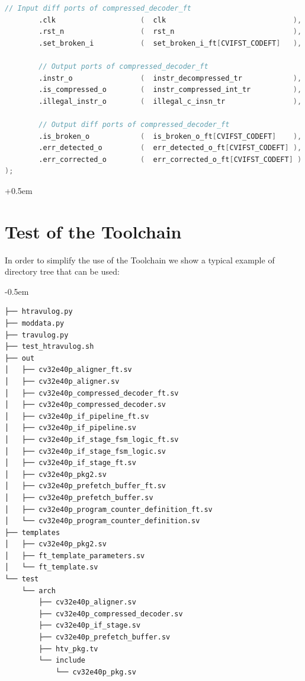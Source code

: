 {{{\begin{lstlisting}[basicstyle=\ttfamily\scriptsize, language=Verilog, caption=SV result code after the conversion from HTV code of Compressed Decoder module, label=lst:CreateAddModuleSV2]
        // Input diff ports of compressed_decoder_ft
        .clk                    (  clk                              ),
        .rst_n                  (  rst_n                            ),
        .set_broken_i           (  set_broken_i_ft[CVIFST_CODEFT]   ),

        // Output ports of compressed_decoder_ft
        .instr_o                (  instr_decompressed_tr            ),
        .is_compressed_o        (  instr_compressed_int_tr          ),
        .illegal_instr_o        (  illegal_c_insn_tr                ),

        // Output diff ports of compressed_decoder_ft
        .is_broken_o            (  is_broken_o_ft[CVIFST_CODEFT]    ),
        .err_detected_o         (  err_detected_o_ft[CVIFST_CODEFT] ),
        .err_corrected_o        (  err_corrected_o_ft[CVIFST_CODEFT] )
);
       			\end{lstlisting}
    		
    		\openup +0.5em
        }%
	}%
	
	\section{Test of the Toolchain}{
	    In order to simplify the use of the Toolchain we show a typical example of directory tree that can be used:
	    
	    
	    \begin{footnotesize}
    	
    	\openup -0.5em
	    
	    \begin{verbatim}
├── htravulog.py
├── moddata.py
├── travulog.py
├── test_htravulog.sh
├── out
│   ├── cv32e40p_aligner_ft.sv
│   ├── cv32e40p_aligner.sv
│   ├── cv32e40p_compressed_decoder_ft.sv
│   ├── cv32e40p_compressed_decoder.sv
│   ├── cv32e40p_if_pipeline_ft.sv
│   ├── cv32e40p_if_pipeline.sv
│   ├── cv32e40p_if_stage_fsm_logic_ft.sv
│   ├── cv32e40p_if_stage_fsm_logic.sv
│   ├── cv32e40p_if_stage_ft.sv
│   ├── cv32e40p_pkg2.sv
│   ├── cv32e40p_prefetch_buffer_ft.sv
│   ├── cv32e40p_prefetch_buffer.sv
│   ├── cv32e40p_program_counter_definition_ft.sv
│   └── cv32e40p_program_counter_definition.sv
├── templates
│   ├── cv32e40p_pkg2.sv
│   ├── ft_template_parameters.sv
│   └── ft_template.sv
└── test
    └── arch
        ├── cv32e40p_aligner.sv
        ├── cv32e40p_compressed_decoder.sv
        ├── cv32e40p_if_stage.sv
        ├── cv32e40p_prefetch_buffer.sv
        ├── htv_pkg.tv
        └── include
            └── cv32e40p_pkg.sv
	    \end{verbatim}
	    

\end{footnotesize}}}
